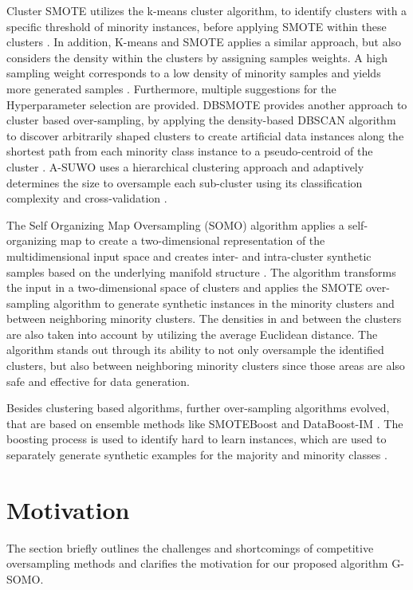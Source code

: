 \documentclass[parskip=full]{scrartcl}
\begin{document}
Cluster SMOTE utilizes the k-means cluster algorithm, to identify clusters with a specific threshold of 
minority instances, before applying SMOTE within these clusters \cite{CieslakCS06}. In addition, K-means 
and SMOTE applies a similar approach, but also considers the density within the clusters by assigning 
samples weights. A high sampling weight corresponds to a low density of minority samples and yields 
more generated samples \cite{Last2017}. Furthermore, multiple suggestions for the Hyperparameter selection 
are provided. DBSMOTE provides another approach to cluster based over-sampling, by applying the 
density-based DBSCAN algorithm to discover arbitrarily shaped clusters to create artificial data 
instances along the shortest path from each minority class instance to a pseudo-centroid of the 
cluster \cite{Bunkhumpornpat2011}. A-SUWO uses a hierarchical clustering approach and adaptively 
determines the size to oversample each sub-cluster using its classification complexity and cross-validation
 \cite{Nekooeimehr2015}. 

The Self Organizing Map Oversampling (SOMO) algorithm applies a self-organizing map to create a two-dimensional 
representation of the multidimensional input space and creates inter- and intra-cluster synthetic 
samples based on the underlying manifold structure \cite{Douzas2017B}. The algorithm transforms the 
input in a two-dimensional space of clusters and applies the SMOTE over-sampling algorithm to generate 
synthetic instances in the minority clusters and between neighboring minority clusters. The densities 
in and between the clusters are also taken into account by utilizing the average Euclidean distance. 
The algorithm stands out through its ability to not only oversample the identified clusters, but also 
between neighboring minority clusters since those areas are also safe and effective for data generation.  

Besides clustering based algorithms, further over-sampling algorithms evolved, that are based on 
ensemble methods like SMOTEBoost \cite{Chawla2003} and DataBoost-IM \cite{Guo2004}. The boosting 
process is used to identify hard to learn instances, which are used to separately generate synthetic 
examples for the majority and minority classes  \cite{Guo2004}.

\section{Motivation}

The section briefly outlines the challenges and shortcomings of competitive oversampling methods 
and clarifies the motivation for our proposed algorithm G-SOMO.
\end{document}
